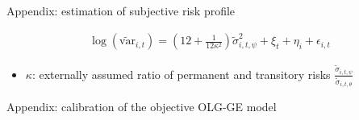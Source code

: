 \documentclass{beamer}
\begin{document}
\begin{frame}{Appendix: estimation of subjective risk profile}
	\label{appendix:RegimeEstimationDetail}
	
	\begin{equation*}
		\begin{split}
				\log(\tilde {\text{var}}_{i,t})= (12+\frac{1}{12\kappa^2})\tilde \sigma^2_{i,t,\psi} + \xi_{t}+\eta_{i}+ \epsilon_{i,t}
			\end{split}
	\end{equation*}
	\begin{itemize}
		
		\item $\kappa$: externally assumed ratio of permanent and transitory risks $\frac{\tilde \sigma_{i,t,\psi}}{\tilde \sigma_{i,t,\theta}}$
		\end{itemize}
	\hyperlink{RegimeEstimation}{} 
\end{frame}


\begin{frame}{Appendix: calibration of the objective OLG-GE model}
	\label{appendix:calibration}
	\hyperlink{objectivemodelresults}{} 
\end{frame}
\end{document}
